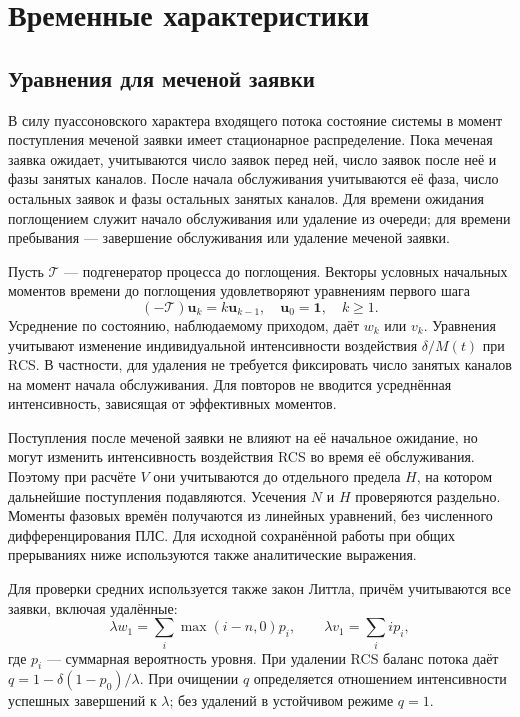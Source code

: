 \section{Временные характеристики}\label{sec:times}
\subsection{Уравнения для меченой заявки}
В силу пуассоновского характера входящего потока состояние системы в момент поступления меченой заявки имеет стационарное распределение. Пока меченая заявка ожидает, учитываются число заявок перед ней, число заявок после неё и фазы занятых каналов. После начала обслуживания учитываются её фаза, число остальных заявок и фазы остальных занятых каналов. Для времени ожидания поглощением служит начало обслуживания или удаление из очереди; для времени пребывания --- завершение обслуживания или удаление меченой заявки.

Пусть \(\mathcal T\) --- подгенератор процесса до поглощения. Векторы условных начальных моментов времени до поглощения удовлетворяют уравнениям первого шага
\[
(-\mathcal T)\boldsymbol u_k=k\boldsymbol u_{k-1},\quad
\boldsymbol u_0=\mathbf1,\quad k\ge1.
\]
Усреднение по состоянию, наблюдаемому приходом, даёт \(w_k\) или \(v_k\). Уравнения учитывают изменение индивидуальной интенсивности воздействия \(\delta/M(t)\) при RCS. В частности, для удаления не требуется фиксировать число занятых каналов на момент начала обслуживания. Для повторов не вводится усреднённая интенсивность, зависящая от эффективных моментов.

Поступления после меченой заявки не влияют на её начальное ожидание, но могут изменить интенсивность воздействия RCS во время её обслуживания. Поэтому при расчёте \(V\) они учитываются до отдельного предела \(H\), на котором дальнейшие поступления подавляются. Усечения \(N\) и \(H\) проверяются раздельно. Моменты фазовых времён получаются из линейных уравнений, без численного дифференцирования ПЛС. Для исходной сохранённой работы при общих прерываниях ниже используются также аналитические выражения.

Для проверки средних используется также закон Литтла, причём учитываются все заявки, включая удалённые:
\[
\lambda w_1=\sum_i\max(i-n,0)p_i,\qquad
\lambda v_1=\sum_i i p_i,
\]
где \(p_i\) --- суммарная вероятность уровня. При удалении RCS баланс потока даёт \(q=1-\delta(1-p_0)/\lambda\). При очищении \(q\) определяется отношением интенсивности успешных завершений к \(\lambda\); без удалений в устойчивом режиме \(q=1\).

